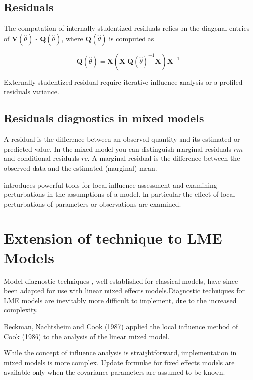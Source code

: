 \documentclass[12pt, a4paper]{report}
\theoremstyle{plain}
\theoremstyle{definition}
\theoremstyle{remark}
\begin{document}
\subsection{Residuals}

The computation of internally studentized residuals relies on the diagonal entries of
$\boldsymbol{V} (\hat{\theta})$ - $\boldsymbol{Q} (\hat{\theta})$, where $\boldsymbol{Q} (\hat{\theta})$ is computed as

\[ \boldsymbol{Q} (\hat{\theta}) = \boldsymbol{X} ( \boldsymbol{X}^{\prime}\boldsymbol{Q} (\hat{\theta})^{-1}\boldsymbol{X})\boldsymbol{X}^{-1} \]

Externally  studentized residual require iterative influence analysis or a profiled residuals variance.


\subsection{Residuals diagnostics in mixed models}

A residual is the difference between an observed quantity and its estimated or predicted value. In the mixed
model you can distinguish marginal residuals $rm$ and conditional residuals $rc$. A marginal residual is the
difference between the observed data and the estimated (marginal) mean.

\citet{cook86} introduces powerful tools for local-influence
assessment and examining perturbations in the assumptions of a
model. In particular the effect of local perturbations of
parameters or observations are examined.



\newpage
\section{Extension of technique to LME Models} %

Model diagnostic techniques , well established for classical models, have since been adapted for use with linear mixed effects models.Diagnostic techniques for LME models are inevitably more difficult to implement, due to the increased complexity.

Beckman, Nachtsheim and Cook (1987) applied the local influence method of Cook (1986)
to the analysis of the linear mixed model.


While the concept of influence analysis is straightforward, implementation in mixed models is more complex. Update formulae for fixed effects models are available only when the covariance parameters are assumed to be known.
\end{document}
